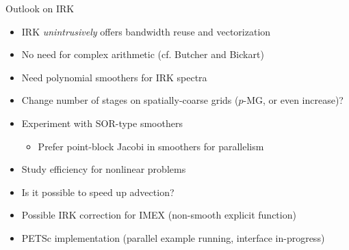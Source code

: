 \documentclass{beamer}
\begin{document}
\begin{frame}{Outlook on IRK}
  \begin{itemize}
  \item IRK \emph{unintrusively} offers bandwidth reuse and vectorization
  \item No need for complex arithmetic (cf. Butcher and Bickart)
  \item Need polynomial smoothers for IRK spectra
  \item Change number of stages on spatially-coarse grids ($p$-MG, or even increase)?
  \item Experiment with SOR-type smoothers
    \begin{itemize}
    \item Prefer point-block Jacobi in smoothers for parallelism
    \end{itemize}
  \item Study efficiency for nonlinear problems
  \item Is it possible to speed up advection?
  \item Possible IRK correction for IMEX (non-smooth explicit function)
  \item PETSc implementation (parallel example running, interface in-progress)
  \end{itemize}
\end{frame}
\end{document}
